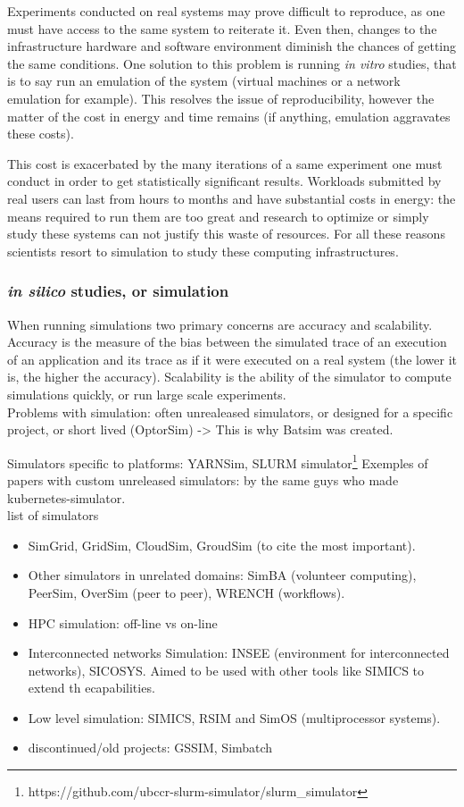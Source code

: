 \documentclass[12pt, a4paper]{memoir}
\begin{document}
Experiments conducted on real systems may prove difficult to reproduce, as one
must have access to the same system to reiterate it. Even then, changes to the
infrastructure hardware and software environment diminish the chances of
getting the same conditions. One solution to this problem is running \textit{in
vitro} studies, that is to say run an emulation of the system (virtual machines
or a network emulation for example). This resolves the issue of
reproducibility, however the matter of the cost in energy and time remains (if
anything, emulation aggravates these costs).

This cost is exacerbated by the many iterations of a same experiment one must
conduct in order to get statistically significant results. Workloads submitted
by real users can last from hours to months and have substantial costs in
energy: the means required to run them are too great and research to optimize
or simply study these systems can not justify this waste of resources. For all
these reasons scientists resort to simulation to study these computing
infrastructures.

\subsubsection{\textit{in silico} studies, or simulation}

When running simulations two primary concerns are accuracy and scalability.
Accuracy is the measure of the bias between the simulated trace of an execution
of an application and its trace as if it were executed on a real system (the
lower it is, the higher the accuracy). Scalability is the ability of the
simulator to compute simulations quickly, or run large scale experiments.\\

Problems with simulation: often unrealeased simulators, or designed for a
specific project, or short lived (OptorSim) -> This is why Batsim was created.

Simulators specific to platforms: YARNSim, SLURM simulator\footnote{https://github.com/ubccr-slurm-simulator/slurm\_simulator} 
Exemples of papers with custom unreleased simulators: \cite{yabuuchi2019lowlatency} by the same guys who made kubernetes-simulator.\\

list of simulators
\begin{itemize}
	\item SimGrid, GridSim, CloudSim, GroudSim (to cite the most important).
	\item Other simulators in unrelated domains: SimBA (volunteer computing), PeerSim, OverSim (peer to peer), WRENCH (workflows).
	\item HPC simulation: off-line vs on-line
	\item Interconnected networks Simulation: INSEE (environment for interconnected networks), SICOSYS. Aimed to be used with other tools like SIMICS to extend th ecapabilities.
	\item Low level simulation: SIMICS, RSIM and SimOS (multiprocessor systems).
	\item discontinued/old projects: GSSIM, Simbatch
\end{itemize}
\end{document}
